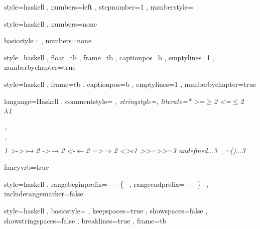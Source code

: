 \usepackage{xcolor}
\usepackage{fancyvrb}
\usepackage[scaled]{beramono}


    { style=haskell
    , numbers=left
    , stepnumber=1
    , numberstyle=\tiny
    }

    { style=haskell
    , numbers=none
    }

    {
    }

    { basicstyle=\color{red}\ttfamily
    , numbers=none
    }

    { style=haskell
    , float=tb
    , frame=tb
    , captionpos=b
    , emptylines=1
    , numberbychapter=true
    }

    { style=haskell
    , frame=tb
    , captionpos=b
    , emptylines=1
    , numberbychapter=true
    }

    { language=Haskell
    , commentstyle=\color[rgb]{0.38,0.63,0.69}\itshape
    , stringstyle=\textcolor[rgb]{0.25,0.44,0.63}
    , literate=*
        {>=}{{$\geq$}}2
        {<=}{{$\leq$}}2
        {\\}{{$\lambda$}}1
        {\\\\}{{\char`\\\char`\\}}1
        {>->}{{$\rightarrowtail$}}2
        {->}{{$\rightarrow$}}2
        {<-}{{$\leftarrow$}}2
        {=>}{{$\Rightarrow$}}2
        {<>}{{$\circ$}}1
        {>>=}{{>>=}}3
        {undefined}{{$\ldots$}}3
        {_=()}{{$\ldots$}}3
    }

    { fancyvrb=true
    }

    { style=haskell
    , rangebeginprefix=----\ \{\ %
    , rangeendprefix=----\ \}\ %
    , includerangemarker=false
    }

\lstset
    { style=haskell
    , basicstyle=\fontsize{8}{10}\ttfamily
    , keepspaces=true
    , showspaces=false
    , showstringspaces=false
    , breaklines=true
    , frame=tb
    }
\lstset{ style=numbers
       , captionpos=b
       }
